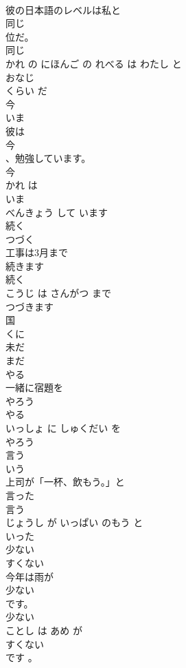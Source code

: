 \documentclass[8pt]{extreport}
\begin{document}
\begin{CJK}{UTF8}{min}
\\	彼の日本語のレベルは私と
\\	同じ
\\	位だ。	
\\	同じ 
\\	かれ の にほんご の れべる は わたし と 
\\	おなじ
\\	くらい だ	
\\	今	
\\	いま	
\\	彼は
\\	今
\\	、勉強しています。	
\\	今 
\\	かれ は 
\\	いま
\\	べんきょう して います	
\\	続く	
\\	つづく	
\\	工事は3月まで
\\	続きます
\\	続く 
\\	こうじ は さんがつ まで 
\\	つづきます
\\	国	
\\	くに	
\\	未だ	
\\	まだ	
\\	やる	
\\	一緒に宿題を
\\	やろう
\\	やる 
\\	いっしょ に しゅくだい を 
\\	やろう
\\	言う	
\\	いう	
\\	上司が「一杯、飲もう。」と
\\	言った
\\	言う 
\\	じょうし が いっぱい のもう と 
\\	いった
\\	少ない	
\\	すくない	
\\	今年は雨が
\\	少ない
\\	です。	
\\	少ない 
\\	ことし は あめ が 
\\	すくない 
\\	です 。	

\end{CJK}
\end{document}
